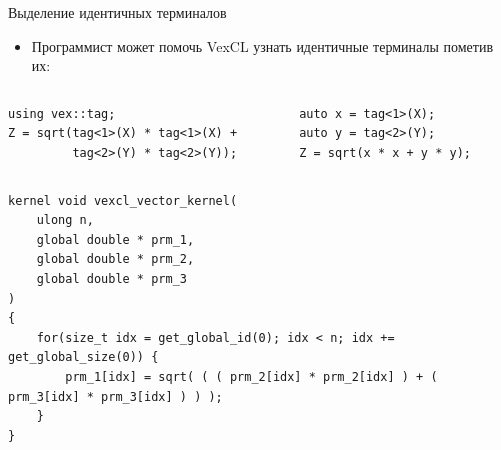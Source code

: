 \documentclass[@BEAMER_OPTIONS@]{beamer}
\begin{document}
\begin{frame}[fragile]{Выделение идентичных терминалов}
    \begin{itemize}
        \item Программист может помочь VexCL узнать идентичные терминалы
            пометив их:
    \end{itemize}
    \begin{columns}
        \begin{column}{0.46\textwidth}
            \begin{exampleblock}{}
                \begin{lstlisting}
using vex::tag;
Z = sqrt(tag<1>(X) * tag<1>(X) +
         tag<2>(Y) * tag<2>(Y));
                \end{lstlisting}
            \end{exampleblock}
        \end{column}
        \begin{column}{0.46\textwidth}
            \begin{exampleblock}{}
                \begin{lstlisting}
auto x = tag<1>(X);
auto y = tag<2>(Y);
Z = sqrt(x * x + y * y);
                \end{lstlisting}
            \end{exampleblock}
        \end{column}
    \end{columns}
    \begin{exampleblock}{}
        \begin{lstlisting}
kernel void vexcl_vector_kernel(
    ulong n,
    global double * prm_1,
    global double * prm_2,
    global double * prm_3
)
{
    for(size_t idx = get_global_id(0); idx < n; idx += get_global_size(0)) {
        prm_1[idx] = sqrt( ( ( prm_2[idx] * prm_2[idx] ) + ( prm_3[idx] * prm_3[idx] ) ) );
    }
}
        \end{lstlisting}
    \end{exampleblock}
\end{frame}
\end{document}
